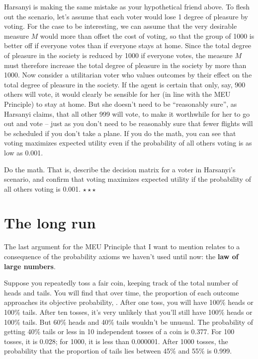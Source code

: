 Harsanyi is making the same mistake as your hypothetical friend
above. To flesh out the scenario, let's assume that each voter would
lose 1 degree of pleasure by voting. For the case to be interesting,
we can assume that the very desirable measure $M$ would more than
offset the cost of voting, so that the group of 1000 is better off if
everyone votes than if everyone stays at home. Since the total degree
of pleasure in the society is reduced by 1000 if everyone votes, the
measure $M$ must therefore increase the total degree of pleasure in
the society by more than 1000. Now consider a utilitarian voter who
values outcomes by their effect on the total degree of pleasure in the
society. If the agent is certain that only, say, 900 others will vote,
it would clearly be sensible for her (in line with the MEU Principle)
to stay at home. But she doesn't need to be ``reasonably sure'', as
Harsanyi claims, that all other 999 will vote, to make it worthwhile
for her to go out and vote -- just as you don't need to be reasonably
sure that fewer flights will be scheduled if you don't take a
plane. If you do the math, you can see that voting maximizes expected
utility even if the probability of all others voting is as low as
0.001.

\begin{exercise}
  Do the math. That is, describe the decision matrix for a voter in
  Harsanyi's scenario, and confirm that voting maximizes expected
  utility if the probability of all others voting is
  0.001. $\star\star\star$
\end{exercise}

\section{The long run}

The last argument for the MEU Principle that I want to mention relates
to a consequence of the probability axioms we haven't used until now:
the \textbf{law of large numbers}.

Suppose you repeatedly toss a fair coin, keeping track of the total
number of heads and tails. You will find that over time, the
proportion of each outcome approaches its objective probability,
. After one toss, you will have 100\% heads or 100\%
tails. After ten tosses, it's very unlikely that you'll still have
100\% heads or 100\% tails. But 60\% heads and 40\% tails wouldn't be
unusual. The probability of getting 40\% tails or less in 10
independent tosses of a coin is 0.377. For 100 tosses, it is 0.028;
for 1000, it is less than 0.000001. After 1000 tosses, the probability
that the proportion of tails lies between 45\% and 55\% is 0.999.

